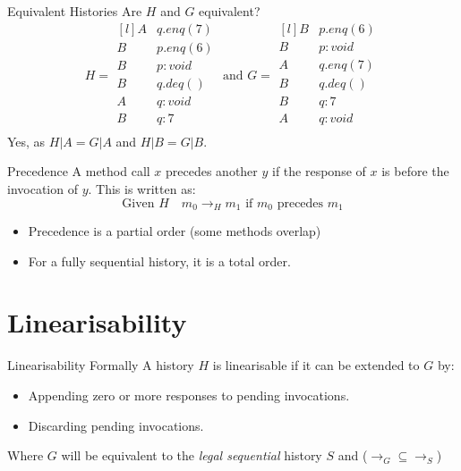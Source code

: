 \begin{examplebox}{Equivalent Histories}
    Are $H$ and $G$ equivalent?
    \[H = \begin{matrix*}[l]
        A & q.enq(7) \\
        B & p.enq(6) \\
        B & p : void \\
        B & q.deq() \\
        A & q: void \\
        B & q: 7 \\
    \end{matrix*} \text{ and } G = \begin{matrix*}[l]
        B & p.enq(6) \\
        B & p : void \\
        A & q.enq(7) \\
        B & q.deq() \\
        B & q: 7 \\
        A & q: void \\
    \end{matrix*}\]
    \tcblower
    Yes, as $H|A = G|A$ and $H|B = G|B$.
\end{examplebox}
\begin{definitionbox}{Precedence}
    A method call $x$ precedes another $y$ if the response of $x$ is before the invocation of $y$. This is written as:
    \[\text{Given } H \quad m_0 \to_H m_1 \text{ if }m_0 \text{ precedes }m_1\]
    \begin{itemize}
        \item Precedence is a partial order (some methods overlap)
        \item For a fully sequential history, it is a total order.
    \end{itemize}
\end{definitionbox}


\section{Linearisability}
\begin{definitionbox}{Linearisability Formally}
    A history $H$ is linearisable if it can be extended to $G$ by:
    \begin{itemize}
        \item Appending zero or more responses to pending invocations.
        \item Discarding pending invocations.
    \end{itemize}
    Where $G$ will be equivalent to the \textit{legal sequential} history $S$ and ($\to_G \subseteq \to_S$)
\end{definitionbox}

